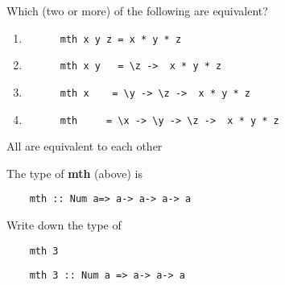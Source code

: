 \documentclass{article}
\begin{document}
\pagebreak
\begin{Exercise}
Which (two or more) of the following are equivalent? 
\begin{enumerate}
     \item  \begin{lstlisting}
      mth x y z = x * y * z
    \end{lstlisting}

    \item  \begin{lstlisting}
      mth x y   = \z ->  x * y * z
    \end{lstlisting}

    \item  \begin{lstlisting}
      mth x    = \y -> \z ->  x * y * z
    \end{lstlisting}

    \item  \begin{lstlisting}
      mth     = \x -> \y -> \z ->  x * y * z
    \end{lstlisting}
  \end{enumerate}
\end{Exercise}
\begin{Answer}
  All are equivalent to each other
\end{Answer}
\begin{Exercise}
  The type of \textbf{mth} (above) is  \begin{lstlisting}
    mth :: Num a=> a-> a-> a-> a
  \end{lstlisting}
  Write down the type of 
  \begin{lstlisting}
    mth 3
  \end{lstlisting} 
\end{Exercise}
\begin{Answer}
  \begin{lstlisting}
    mth 3 :: Num a => a-> a-> a
  \end{lstlisting} 
\end{Answer}
\end{document}
